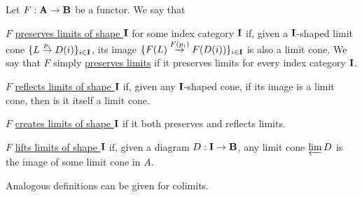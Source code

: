 \begin{definition}\label{def:categorical_limit_preservation}\cite[definitions 5.3.1, 5.3.5]{Leinster2014}
  Let $F: \operatorname{\mathbf{A}} \to \operatorname{\mathbf{B}}$ be a functor. We say that
  \begin{defenum}
    \item\label{def:categorical_limit_preservation/preserve} $F$ \ul{preserves limits of shape $\operatorname{\mathbf{I}}$} for some index category $\operatorname{\mathbf{I}}$ if, given a $\operatorname{\mathbf{I}}$-shaped limit cone \mbox{$\{ L \overset {p_i} \to D(i) \}_{i \in \operatorname{\mathbf{I}}}$}, its image \mbox{$\{ F(L) \overset {F(p_i)} \to F(D(i)) \}_{i \in \operatorname{\mathbf{I}}}$} is also a limit cone. We say that $F$ simply \ul{preserves limits} if it preserves limits for every index category $\operatorname{\mathbf{I}}$.

    \item\label{def:categorical_limit_preservation/reflect} $F$ \ul{reflects limits of shape $\operatorname{\mathbf{I}}$} if, given any $\operatorname{\mathbf{I}}$-shaped cone, if its image is a limit cone, then is it itself a limit cone.

    \item\label{def:categorical_limit_preservation/create} $F$ \ul{creates limits of shape $\operatorname{\mathbf{I}}$} if it both preserves and reflects limits.

    \item\label{def:categorical_limit_preservation/lift} $F$ \ul{lifts limits of shape $\operatorname{\mathbf{I}}$} if, given a diagram $D: \operatorname{\mathbf{I}} \to \operatorname{\mathbf{B}}$, any limit cone $\varprojlim D$ is the image of some limit cone in $A$.
  \end{defenum}
\end{definition}

\begin{note}\label{note:categorical_colimit_preservation}
  Analogous definitions can be given for colimits.
\end{note}

